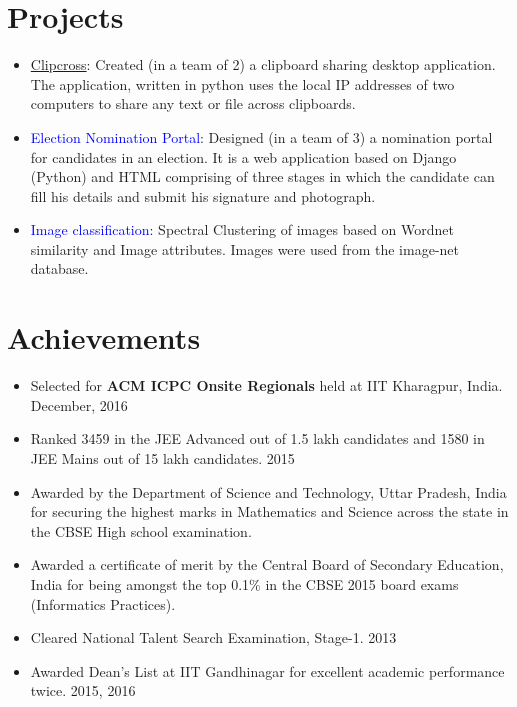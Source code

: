 \documentclass[margin, centered]{res}
\begin{document}
\begin{resume}
\section{Projects}
\begin{itemize}[leftmargin=*]
\item \href{https://github.com/arikpamnani/clipcross}{Clipcross}: Created (in a team of 2) a clipboard sharing desktop application. The application, written in python uses the local IP addresses of two computers to share any text or file across clipboards.

\item \textcolor{blue}{Election Nomination Portal}: Designed (in a team of 3) a nomination portal for candidates in an election. It is a web application based on Django (Python) and HTML comprising of three stages in which the candidate can fill his details and submit his signature and photograph.

\item \textcolor{blue}{Image classification}: Spectral Clustering of images based on Wordnet similarity and Image attributes. Images were used from the image-net database. 

\end{itemize}

\section{Achievements}
\begin{itemize}[leftmargin=*]
\item Selected for {\bf ACM ICPC Onsite Regionals} held at IIT Kharagpur, India. 
\hfill {December, 2016}
\item Ranked 3459 in the JEE Advanced out of 1.5 lakh candidates and 1580 in JEE Mains out of 15 lakh candidates.
\hfill {2015}
\item Awarded by the Department of Science and Technology, Uttar Pradesh, India for securing the highest marks in Mathematics and Science across the state in the CBSE High school examination.
\item Awarded a certificate of merit by the Central Board of Secondary Education, India for being amongst the top 0.1\% in the CBSE 2015 board exams (Informatics Practices).
\item Cleared National Talent Search Examination, Stage-1. \hfill{2013}
\item Awarded Dean’s List at IIT Gandhinagar for excellent academic performance twice. \hfill{2015, 2016}
\end{itemize}


\end{resume}
\end{document}
